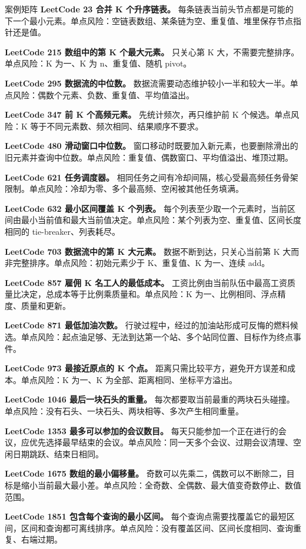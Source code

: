 \begin{principlebox}{案例矩阵}
\textbf{LeetCode 23 合并 K 个升序链表。}
每条链表当前头节点都是可能的下一个最小元素。单点风险：空链表数组、某条链为空、重复值、堆里保存节点指针还是值。

\textbf{LeetCode 215 数组中的第 K 个最大元素。}
只关心第 K 大，不需要完整排序。单点风险：K 为一、K 为 n、重复值、随机 pivot。

\textbf{LeetCode 295 数据流的中位数。}
数据流需要动态维护较小一半和较大一半。单点风险：偶数个元素、负数、重复值、平均值溢出。

\textbf{LeetCode 347 前 K 个高频元素。}
先统计频次，再只维护前 K 个候选。单点风险：K 等于不同元素数、频次相同、结果顺序不要求。

\textbf{LeetCode 480 滑动窗口中位数。}
窗口移动时既要加入新元素，也要删除滑出的旧元素并查询中位数。单点风险：重复值、偶数窗口、平均值溢出、堆顶过期。

\textbf{LeetCode 621 任务调度器。}
相同任务之间有冷却间隔，核心受最高频任务骨架限制。单点风险：冷却为零、多个最高频、空闲被其他任务填满。

\textbf{LeetCode 632 最小区间覆盖 K 个列表。}
每个列表至少取一个元素时，当前区间由最小当前值和最大当前值决定。单点风险：某个列表为空、重复值、区间长度相同的 tie-breaker、列表耗尽。

\textbf{LeetCode 703 数据流中的第 K 大元素。}
数据不断到达，只关心当前第 K 大而非完整排序。单点风险：初始元素少于 K、重复值、K 为一、连续 add。

\textbf{LeetCode 857 雇佣 K 名工人的最低成本。}
工资比例由当前队伍中最高工资质量比决定，总成本等于比例乘质量和。单点风险：K 为一、比例相同、浮点精度、质量和更新。

\textbf{LeetCode 871 最低加油次数。}
行驶过程中，经过的加油站形成可反悔的燃料候选。单点风险：起点油足够、无法到达第一个站、多个站同位置、目标作为终点事件。

\textbf{LeetCode 973 最接近原点的 K 个点。}
距离只需比较平方，避免开方误差和成本。单点风险：K 为一、K 为全部、距离相同、坐标平方溢出。

\textbf{LeetCode 1046 最后一块石头的重量。}
每次都要取当前最重的两块石头碰撞。单点风险：没有石头、一块石头、两块相等、多次产生相同重量。

\textbf{LeetCode 1353 最多可以参加的会议数目。}
每天只能参加一个正在进行的会议，应优先选择最早结束的会议。单点风险：同一天多个会议、过期会议清理、空闲日期跳跃、结束日相同。

\textbf{LeetCode 1675 数组的最小偏移量。}
奇数可以先乘二，偶数可以不断除二，目标是缩小当前最大最小差。单点风险：全奇数、全偶数、最大值变奇数停止、数值范围。

\textbf{LeetCode 1851 包含每个查询的最小区间。}
每个查询点需要找覆盖它的最短区间，区间和查询都可离线排序。单点风险：没有覆盖区间、区间长度相同、查询重复、右端过期。

\end{principlebox}

